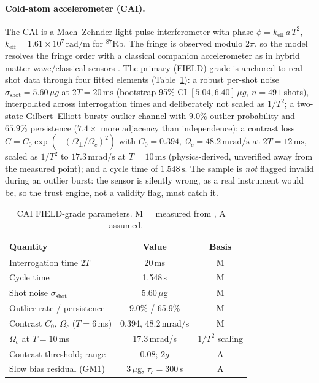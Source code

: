 \documentclass[12pt,a4paper]{article}
\begin{document}
\paragraph{Cold-atom accelerometer (CAI).}
The CAI is a Mach--Zehnder light-pulse interferometer with phase $\phi = k_{\mathrm{eff}}\,a\,T^2$, $k_{\mathrm{eff}} = 1.61\times10^{7}\,\mathrm{rad/m}$ for $^{87}$Rb. The fringe is observed modulo $2\pi$, so the model resolves the fringe order with a classical companion accelerometer as in hybrid matter-wave/classical sensors \cite{cheiney2018navigation,templier2022tracking,wright2022cold}. The primary (FIELD) grade is anchored to real shot data \cite{darmagnac2024atom,darmagnac2024dataset} through four fitted elements (Table~\ref{tab:cai}): a robust per-shot noise $\sigma_{\mathrm{shot}} = 5.60\,\mu g$ at $2T = 20\,\mathrm{ms}$ (bootstrap 95\% CI $[5.04, 6.40]\,\mu g$, $n=491$ shots), interpolated across interrogation times and deliberately not scaled as $1/T^2$; a two-state Gilbert--Elliott bursty-outlier channel with $9.0\%$ outlier probability and $65.9\%$ persistence ($7.4\times$ more adjacency than independence); a contrast loss $C = C_0\exp(-(\Omega_\perp/\Omega_c)^2)$ with $C_0 = 0.394$, $\Omega_c = 48.2\,\mathrm{mrad/s}$ at $2T=12\,\mathrm{ms}$, scaled as $1/T^2$ to $17.3\,\mathrm{mrad/s}$ at $T=10\,\mathrm{ms}$ (physics-derived, unverified away from the measured point); and a cycle time of $1.548\,\mathrm{s}$. The sample is \emph{not} flagged invalid during an outlier burst: the sensor is silently wrong, as a real instrument would be, so the trust engine, not a validity flag, must catch it.

\begin{table}[ht]
\centering
\caption{CAI FIELD-grade parameters. M = measured from \cite{darmagnac2024atom,darmagnac2024dataset}, A = assumed.}
\label{tab:cai}
\small
\begin{tabular}{lcc}
\toprule
Quantity & Value & Basis \\
\midrule
Interrogation time $2T$ & 20\,ms & M \\
Cycle time & 1.548\,s & M \\
Shot noise $\sigma_{\mathrm{shot}}$ & 5.60\,$\mu$g & M \\
Outlier rate / persistence & 9.0\% / 65.9\% & M \\
Contrast $C_0$, $\Omega_c$ ($T{=}6$\,ms) & 0.394, 48.2\,mrad/s & M \\
$\Omega_c$ at $T{=}10$\,ms & 17.3\,mrad/s & $1/T^2$ scaling \\
Contrast threshold; range & 0.08; $2g$ & A \\
Slow bias residual (GM1) & 3\,$\mu$g, $\tau_c{=}300$\,s & A \\
\bottomrule
\end{tabular}
\end{table}
\end{document}
